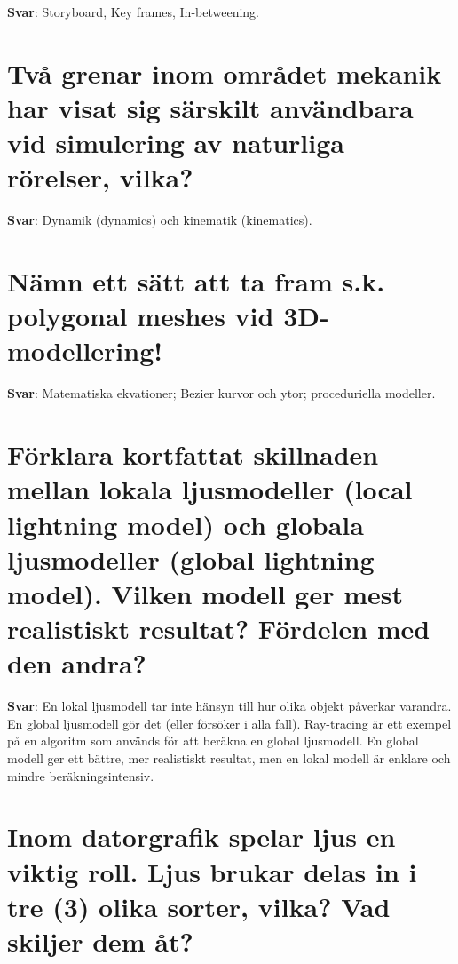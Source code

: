 \documentclass[a4paper,11pt,oneside]{book}
\begin{document}
\begin{sloppypar}
\label{q:302:sa:sv:True}

\textbf{Svar}: Storyboard, Key frames, In-betweening.



\section{Tv\r{a} grenar inom omr\r{a}det mekanik har visat sig s\"arskilt anv\"andbara vid simulering av naturliga r\"orelser, vilka?}

\label{q:303:sa:sv:True}

\textbf{Svar}: Dynamik (dynamics) och kinematik (kinematics).



\section{N\"amn ett s\"att att ta fram s.k. polygonal meshes vid 3D-modellering!}

\label{q:304:sa:sv:True}

\textbf{Svar}: Matematiska ekvationer; Bezier kurvor och ytor; proceduriella modeller.



\section{F\"orklara kortfattat skillnaden mellan lokala ljusmodeller (local lightning model) och globala ljusmodeller (global lightning model). Vilken modell ger mest realistiskt resultat? F\"ordelen med den andra?}

\label{q:305:sa:sv:True}

\textbf{Svar}: En lokal ljusmodell tar inte h\"ansyn till hur olika objekt p\r{a}verkar varandra. En global ljusmodell g\"or det (eller f\"ors\"oker i alla fall). Ray-tracing \"ar ett exempel p\r{a} en algoritm som anv\"ands f\"or att ber\"akna en global ljusmodell. En global modell ger ett b\"attre, mer realistiskt resultat, men en lokal modell \"ar enklare och mindre ber\"akningsintensiv.



\section{Inom datorgrafik spelar ljus en viktig roll. Ljus brukar delas in i tre (3) olika sorter, vilka? Vad skiljer dem \r{a}t?}

\label{q:306:sa:sv:True}


\end{sloppypar}
\end{document}

